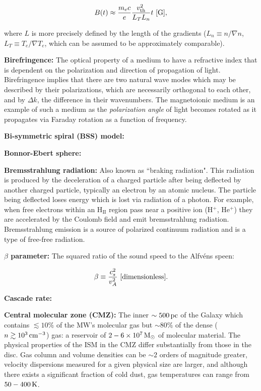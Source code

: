 \documentclass[a4paper,10pt]{article}
\begin{document}
\begin{align*}
    B(t) \approx \frac{m_ec}{e}\frac{v_{\rm th}^2}{L_TL_n}t ~ [{\rm G}],
\end{align*}

{\noindent}where $L$ is more precisely defined by the length of the gradients ($L_n\equiv n/\nabla n$, $L_T\equiv T_e/\nabla T_e$, which can be assumed to be approximately comparable).

{\noindent}\textbf{Birefringence:} The optical property of a medium to have a refractive index that is dependent on the polarization and direction of propagation of light. Birefringence implies that there are two natural wave modes which may be described by their polarizations, which are necessarily orthogonal to each other, and by $\Delta k$, the difference in their wavenumbers. The magnetoionic medium is an example of such a medium as the \textit{polarization angle} of light becomes rotated as it propagates via Faraday rotation as a function of frequency.

{\noindent}\textbf{Bi-symmetric spiral (BSS) model:}

{\noindent}\textbf{Bonnor-Ebert sphere:}

{\noindent}\textbf{Bremsstrahlung radiation:} Also known as ``braking radiation". This radiation is produced by the deceleration of a charged particle after being deflected by another charged particle, typically an electron by an atomic nucleus. The particle being deflected loses energy which is lost via radiation of a photon. For example, when free electrons within an H$_\mathrm{II}$ region pass near a positive ion (H$^+$, He$^+$) they are accelerated by the Coulomb field and emit bremsstrahlung radiation. Bremsstrahlung emission is a source of polarized continuum radiation and is a type of free-free radiation.

{\noindent}\textbf{$\beta$ parameter:} The squared ratio of the sound speed to the Alfv\'ens speen:

\begin{align*}
    \beta \equiv \frac{c_s^2}{v_A^2} ~ [{\rm dimensionless}].
\end{align*}

{\noindent}\textbf{Cascade rate:}

{\noindent}\textbf{Central molecular zone (CMZ):} The inner $\sim500\,{\rm pc}$ of the Galaxy which contains $\lesssim10\%$ of the MW's molecular gas but $\sim80\%$ of the dense ($n\gtrsim10^3\,{\rm cm^{-3}}$) gas: a reservoir of $2-6\times10^7\,{\rm M_\odot}$ of molecular material. The physical properties of the ISM in the CMZ differ substantially from those in the disc. Gas column and volume densities can be $\sim2$ orders of magnitude greater, velocity dispersions measured for a given physical size are larger, and although there exists a significant fraction of cold dust, gas temperatures can range from $50-400\,{\rm K}$.
\end{document}
